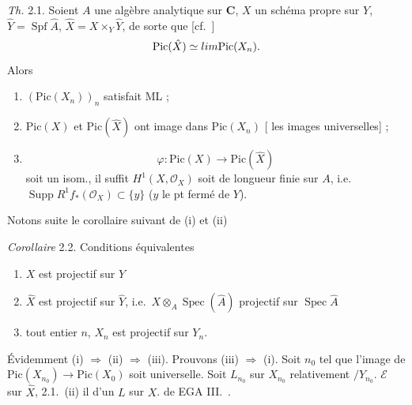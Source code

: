 \documentclass[11pt,a4paper]{article}
\begin{document}
\emph{Th.} 2.1. Soient $A$ une algèbre analytique sur $\mathbf{C}$,  $X$ un schéma propre sur $Y$, \struck{\ill{}} $\hat{Y} = \operatorname{Spf} \hat{A}$, $\hat{X} = X \times_Y \hat{Y}$, \struck{\ill{}} de sorte que [cf.\ \ill{}]
\[
\mathrm{Pic}(\hat{X}) \simeq \varprojlim \mathrm{Pic}(X_n).
\]
Alors
\begin{enumerate}
  \item[(i)] $(\mathrm{Pic}(X_n))_n$ satisfait ML ;
  \item[(ii)] $\mathrm{Pic}(X)$ et $\mathrm{Pic}(\hat{X})$ ont  image dans $\mathrm{Pic}(X_n)$ [ les images universelles] ;
  \item[(iii)] 
  \[
  \varphi : \mathrm{Pic}(X) \to \mathrm{Pic}(\hat{X})
  \]
  soit un isom., il suffit  $H^1(X, \mathcal{O}_X)$ soit de longueur finie sur $A$, i.e.\  $\operatorname{Supp} R^1 f_*(\mathcal{O}_X) \subset \{y\}$ ($y$ le pt fermé de $Y$).
\end{enumerate}


Notons  suite le corollaire suivant  de (i) et (ii)

\emph{Corollaire} 2.2. Conditions équivalentes

\begin{enumerate}
  \item[(i)] $X$ est projectif sur $Y$
  \item[(ii)] $\hat{X}$ est projectif sur $\hat{Y}$, i.e.\ $X \otimes_A \operatorname{Spec}(\hat{A})$ projectif sur $\operatorname{Spec} \hat{A}$
  \item[(iii)]  tout entier $n$, $X_n$ est projectif sur $Y_n$.
\end{enumerate}

Évidemment (i) $\Rightarrow$ (ii) $\Rightarrow$ (iii). Prouvons (iii) $\Rightarrow$ (i). Soit $n_0$ tel que l'image de $\mathrm{Pic}(X_{n_0}) \to \mathrm{Pic}(X_0)$ soit universelle. Soit $L_{n_0}$   sur $X_{n_0}$   relativement $/Y_{n_0}$.   \ill{}   $\mathcal{E}$ sur $\hat{X}$,     2.1.\ (ii) il   d'un    $L$ sur $X$.       de EGA III.\ .
\end{document}
